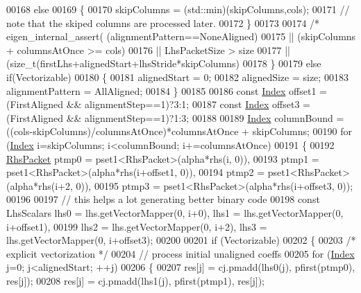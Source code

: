 \begin{DoxyCode}
00168     \textcolor{keywordflow}{else}
00169     \{
00170       skipColumns = (std::min)(skipColumns,cols);
00171       \textcolor{comment}{// note that the skiped columns are processed later.}
00172     \}
00173 
00174     \textcolor{comment}{/*    eigen\_internal\_assert(  (alignmentPattern==NoneAligned)}
00175 \textcolor{comment}{                      || (skipColumns + columnsAtOnce >= cols)}
00176 \textcolor{comment}{                      || LhsPacketSize > size}
00177 \textcolor{comment}{                      || (size\_t(firstLhs+alignedStart+lhsStride*skipColumns)%
00178   \}
00179   \textcolor{keywordflow}{else} \textcolor{keywordflow}{if}(Vectorizable)
00180   \{
00181     alignedStart = 0;
00182     alignedSize = size;
00183     alignmentPattern = AllAligned;
00184   \}
00185 
00186   \textcolor{keyword}{const} \hyperlink{namespace_eigen_a62e77e0933482dafde8fe197d9a2cfde}{Index} offset1 = (FirstAligned && alignmentStep==1)?3:1;
00187   \textcolor{keyword}{const} \hyperlink{namespace_eigen_a62e77e0933482dafde8fe197d9a2cfde}{Index} offset3 = (FirstAligned && alignmentStep==1)?1:3;
00188 
00189   \hyperlink{namespace_eigen_a62e77e0933482dafde8fe197d9a2cfde}{Index} columnBound = ((cols-skipColumns)/columnsAtOnce)*columnsAtOnce + skipColumns;
00190   \textcolor{keywordflow}{for} (\hyperlink{namespace_eigen_a62e77e0933482dafde8fe197d9a2cfde}{Index} i=skipColumns; i<columnBound; i+=columnsAtOnce)
00191   \{
00192     \hyperlink{class_eigen_1_1internal_1_1_tensor_lazy_evaluator_writable}{RhsPacket} ptmp0 = pset1<RhsPacket>(alpha*rhs(i, 0)),
00193               ptmp1 = pset1<RhsPacket>(alpha*rhs(i+offset1, 0)),
00194               ptmp2 = pset1<RhsPacket>(alpha*rhs(i+2, 0)),
00195               ptmp3 = pset1<RhsPacket>(alpha*rhs(i+offset3, 0));
00196 
00197     \textcolor{comment}{// this helps a lot generating better binary code}
00198     \textcolor{keyword}{const} LhsScalars lhs0 = lhs.getVectorMapper(0, i+0),   lhs1 = lhs.getVectorMapper(0, i+offset1),
00199                      lhs2 = lhs.getVectorMapper(0, i+2),   lhs3 = lhs.getVectorMapper(0, i+offset3);
00200 
00201     \textcolor{keywordflow}{if} (Vectorizable)
00202     \{
00203       \textcolor{comment}{/* explicit vectorization */}
00204       \textcolor{comment}{// process initial unaligned coeffs}
00205       \textcolor{keywordflow}{for} (\hyperlink{namespace_eigen_a62e77e0933482dafde8fe197d9a2cfde}{Index} j=0; j<alignedStart; ++j)
00206       \{
00207         res[j] = cj.pmadd(lhs0(j), pfirst(ptmp0), res[j]);
00208         res[j] = cj.pmadd(lhs1(j), pfirst(ptmp1), res[j]);
}
\end{DoxyCode}
